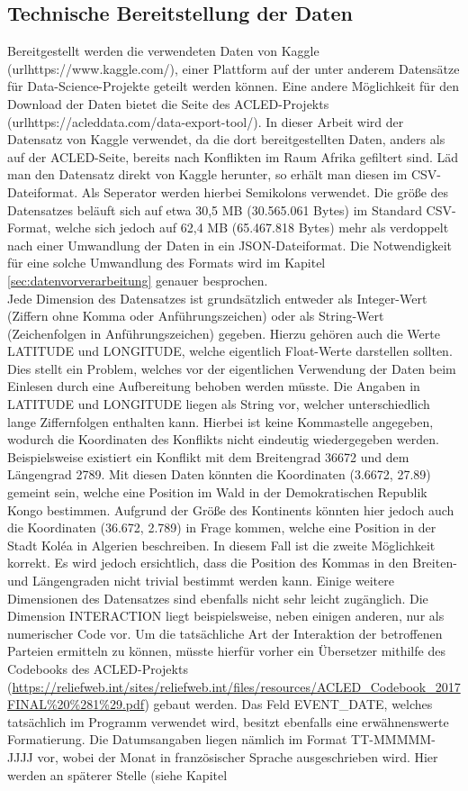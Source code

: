 \documentclass[usegeometry=true]{scrartcl}
\begin{document}
\subsection{Technische Bereitstellung der Daten}

Bereitgestellt werden die verwendeten Daten von Kaggle (url{https://www.kaggle.com/}), einer Plattform auf der unter anderem Datensätze für Data-Science-Projekte geteilt werden können. Eine andere Möglichkeit für den Download der Daten bietet die Seite des ACLED-Projekts (url{https://acleddata.com/data-export-tool/}). In dieser Arbeit wird der Datensatz von Kaggle verwendet, da die dort bereitgestellten Daten, anders als auf der ACLED-Seite, bereits nach Konflikten im Raum Afrika gefiltert sind. Läd man den Datensatz direkt von Kaggle herunter, so erhält man diesen im CSV-Dateiformat. Als Seperator werden hierbei Semikolons verwendet. Die größe des Datensatzes beläuft sich auf etwa 30,5 MB (30.565.061 Bytes) im Standard CSV-Format, welche sich jedoch auf 62,4 MB (65.467.818 Bytes) mehr als verdoppelt nach einer Umwandlung der Daten in ein JSON-Dateiformat. Die Notwendigkeit für eine solche Umwandlung des Formats wird im Kapitel \ref{sec:datenvorverarbeitung} genauer besprochen.\\ Jede Dimension des Datensatzes ist grundsätzlich entweder als Integer-Wert (Ziffern ohne Komma oder Anführungszeichen) oder als String-Wert (Zeichenfolgen in Anführungszeichen) gegeben. Hierzu gehören auch die Werte LATITUDE und LONGITUDE, welche eigentlich Float-Werte darstellen sollten. Dies stellt ein Problem, welches vor der eigentlichen Verwendung der Daten beim Einlesen durch eine Aufbereitung behoben werden müsste. Die Angaben in LATITUDE und LONGITUDE liegen als String vor, welcher unterschiedlich lange Ziffernfolgen enthalten kann. Hierbei ist keine Kommastelle angegeben, wodurch die Koordinaten des Konflikts nicht eindeutig wiedergegeben werden. Beispielsweise existiert ein Konflikt mit dem Breitengrad 36672 und dem Längengrad 2789. Mit diesen Daten könnten die Koordinaten (3.6672, 27.89) gemeint sein, welche eine Position im Wald in der Demokratischen Republik Kongo bestimmen. Aufgrund der Größe des Kontinents könnten hier jedoch auch die Koordinaten (36.672, 2.789) in Frage kommen, welche eine Position in der Stadt Koléa in Algerien beschreiben. In diesem Fall ist die zweite Möglichkeit korrekt. Es wird jedoch ersichtlich, dass die Position des Kommas in den Breiten- und Längengraden nicht trivial bestimmt werden kann. Einige weitere Dimensionen des Datensatzes sind ebenfalls nicht sehr leicht zugänglich. Die Dimension INTERACTION liegt beispielsweise, neben einigen anderen, nur als numerischer Code vor. Um die tatsächliche Art der Interaktion der betroffenen Parteien ermitteln zu können, müsste hierfür vorher ein Übersetzer mithilfe des Codebooks des ACLED-Projekts (\url{https://reliefweb.int/sites/reliefweb.int/files/resources/ACLED_Codebook_2017FINAL%20%281%29.pdf}) gebaut werden. Das Feld EVENT\_DATE, welches tatsächlich im Programm verwendet wird, besitzt ebenfalls eine erwähnenswerte Formatierung. Die Datumsangaben liegen nämlich im Format \glqq TT-MMMMM-JJJJ\grqq{} vor, wobei der Monat in französischer Sprache ausgeschrieben wird. Hier werden an späterer Stelle (siehe Kapitel 
\end{document}
